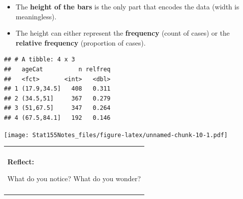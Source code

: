 \documentclass[]{book}
\newenvironment{Shaded}{\begin{snugshade}}{\end{snugshade}}
\newcommand{\CommentTok}[1]{\textcolor[rgb]{0.56,0.35,0.01}{\textit{#1}}}
\newcommand{\DataTypeTok}[1]{\textcolor[rgb]{0.13,0.29,0.53}{#1}}
\newcommand{\KeywordTok}[1]{\textcolor[rgb]{0.13,0.29,0.53}{\textbf{#1}}}
\newcommand{\NormalTok}[1]{#1}
\newcommand{\OperatorTok}[1]{\textcolor[rgb]{0.81,0.36,0.00}{\textbf{#1}}}
\newcommand{\StringTok}[1]{\textcolor[rgb]{0.31,0.60,0.02}{#1}}
\providecommand{\tightlist}{%
  \setlength{\itemsep}{0pt}\setlength{\parskip}{0pt}}
\newenvironment{reflect}
{
    \begin{center}
    
    \begin{tabular}{|p{0.8\textwidth}|}
    \rowcolor{LightBlue}
    \hline\\
    \rowcolor{LightBlue}
    \textbf{Reflect:}
}
{
    \\\rowcolor{LightBlue}
    \\\hline
    \end{tabular} 
    \end{center}
}
\begin{document}
\begin{itemize}
\tightlist
\item
  The \textbf{height of the bars} is the only part that encodes the data (width is meaningless).
\item
  The height can either represent the \textbf{frequency} (count of cases) or the \textbf{relative frequency} (proportion of cases).
\end{itemize}

\begin{Shaded}
\end{Shaded}

\begin{verbatim}
## # A tibble: 4 x 3
##   ageCat          n relfreq
##   <fct>       <int>   <dbl>
## 1 (17.9,34.5]   408   0.311
## 2 (34.5,51]     367   0.279
## 3 (51,67.5]     347   0.264
## 4 (67.5,84.1]   192   0.146
\end{verbatim}

\begin{Shaded}
\end{Shaded}

\texttt{[image: Stat155Notes\_files/figure-latex/unnamed-chunk-10-1.pdf]}

\begin{reflect}
What do you notice? What do you wonder?
\end{reflect}
\end{document}
